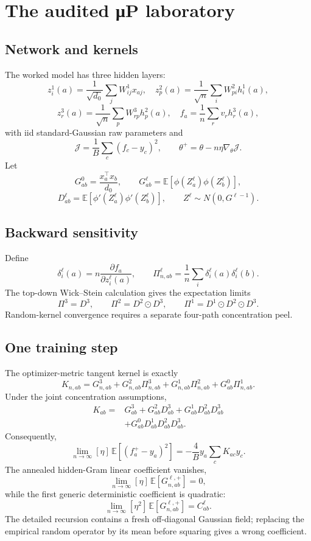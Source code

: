 \documentclass[11pt,oneside]{report}
\newcommand{\odotprod}{\mathbin{\odot}}
\begin{document}
\chapter{The audited μP laboratory}

\section{Network and kernels}

The worked model has three hidden layers:
\[
z_i^1(a)=\frac1{\sqrt{d_0}}\sum_jW^1_{ij}x_{aj},\quad
z_p^2(a)=\frac1{\sqrt n}\sum_iW^2_{pi}h_i^1(a),
\]
\[
z_r^3(a)=\frac1{\sqrt n}\sum_pW^3_{rp}h_p^2(a),\quad
f_a=\frac1n\sum_rv_rh_r^3(a),
\]
with iid standard-Gaussian raw parameters and
\[
\mathcal J=\frac1B\sum_c(f_c-y_c)^2,\qquad
\theta^+=\theta-n\eta\nabla_\theta\mathcal J.
\]
Let
\[
G^0_{ab}=\frac{x_a^\top x_b}{d_0},\qquad
G^\ell_{ab}=\mathbb E[\phi(Z^\ell_a)\phi(Z^\ell_b)],
\]
\[
D^\ell_{ab}=\mathbb E[\phi'(Z^\ell_a)\phi'(Z^\ell_b)],
\qquad Z^\ell\sim N(0,G^{\ell-1}).
\]

\section{Backward sensitivity}

Define
\[
\delta_i^\ell(a)=n\frac{\partial f_a}{\partial z_i^\ell(a)},\qquad
\Pi^\ell_{n,ab}=\frac1n\sum_i\delta_i^\ell(a)\delta_i^\ell(b).
\]
The top-down Wick--Stein calculation gives the expectation limits
\[
\Pi^3=D^3,\qquad
\Pi^2=D^2\odotprod D^3,\qquad
\Pi^1=D^1\odotprod D^2\odotprod D^3.
\]
Random-kernel convergence requires a separate four-path concentration peel.

\section{One training step}

The optimizer-metric tangent kernel is exactly
\[
K_{n,ab}
=G^3_{n,ab}
+G^2_{n,ab}\Pi^3_{n,ab}
+G^1_{n,ab}\Pi^2_{n,ab}
+G^0_{ab}\Pi^1_{n,ab}.
\]
Under the joint concentration assumptions,
\[
\begin{aligned}
K_{ab}
={}&G^3_{ab}+G^2_{ab}D^3_{ab}
+G^1_{ab}D^2_{ab}D^3_{ab}\\
&+G^0_{ab}D^1_{ab}D^2_{ab}D^3_{ab}.
\end{aligned}
\]
Consequently,
\[
\lim_{n\to\infty}[\eta]\,
\mathbb E[(f_a^+-y_a)^2]
=-\frac4B y_a\sum_cK_{ac}y_c.
\]
The annealed hidden-Gram linear coefficient vanishes,
\[
\lim_{n\to\infty}[\eta]\,
\mathbb E[G_{n,ab}^{\ell,+}]=0,
\]
while the first generic deterministic coefficient is quadratic:
\[
\lim_{n\to\infty}[\eta^2]\,
\mathbb E[G_{n,ab}^{\ell,+}]=C^\ell_{ab}.
\]
The detailed recursion contains a fresh off-diagonal Gaussian field; replacing
the empirical random operator by its mean before squaring gives a wrong
coefficient.
\end{document}
